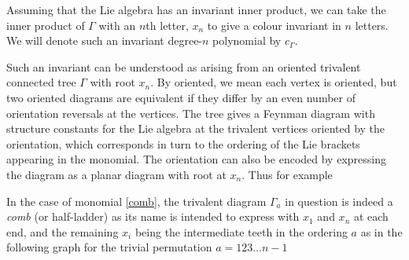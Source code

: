 \documentclass[11pt]{article}
\newcommand{\1}{{\rm 1\hskip-0.25em I}}
\begin{document}
Assuming that the Lie algebra has an invariant inner product, we can take the inner product of $\Gamma$ with an $n$th letter, $x_n$ to give a colour invariant in $n$ letters. 
 We will denote such an invariant degree-$n$ polynomial by $c_\Gamma$.



Such an invariant can be understood as arising from an oriented trivalent connected tree $\Gamma$ with  root $x_n$.  By oriented, we mean each  vertex is oriented, but two oriented diagrams are equivalent if they differ by an even number of orientation reversals at the vertices.  The tree gives a Feynman diagram with structure constants for the Lie algebra at the trivalent vertices oriented by the orientation, which corresponds in turn to the ordering of the Lie brackets appearing in the monomial.  The orientation can also be encoded by expressing the diagram as a planar diagram with  root at $x_n$. Thus for example
\begin{adjustbox}{width=.8\textwidth
,center}%
\end{adjustbox}

 In the case of monomial \eqref{comb}, the trivalent diagram $\Gamma_a$ in question is indeed a \emph{comb} (or half-ladder) as its name is intended to express with $x_1$ and $x_n$ at each end, and the remaining $x_i$ being the intermediate teeth in the ordering $a$ as in the following graph %
  for the trivial permutation $a=123\ldots n-1$

\begin{center}
\begin{adjustbox}{width=.5\textwidth,center}%
\end{adjustbox}
\end{center}  
  
\end{document}
